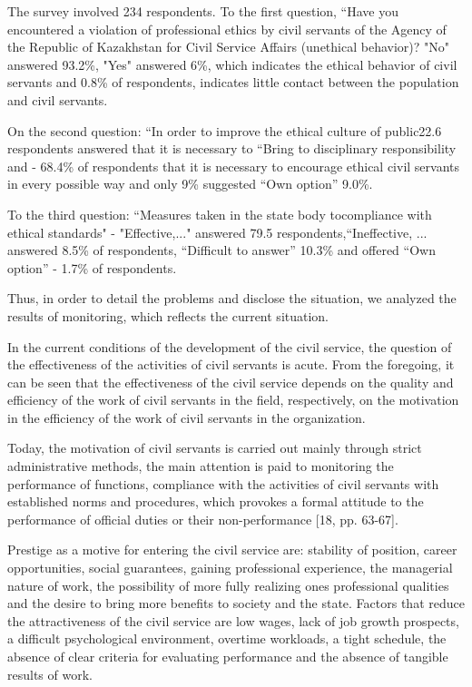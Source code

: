 \begin{multicols}{2}
The survey involved 234 respondents. To the first question, ``Have you
encountered a violation of professional ethics by civil servants of the
Agency of the Republic of Kazakhstan for Civil Service Affairs
(unethical behavior)? "No" answered 93.2\%, "Yes" answered 6\%, which
indicates the ethical behavior of civil servants and 0.8\% of
respondents, indicates little contact between the population and civil
servants.

On the second question: ``In order to improve the ethical culture of
public22.6 respondents answered that it is necessary to ``Bring to
disciplinary responsibility and - 68.4\% of respondents that it is
necessary to encourage ethical civil servants in every possible way and
only 9\% suggested ``Own option'' 9.0\%.

To the third question: ``Measures taken in the state body tocompliance
with ethical standards" - "Effective,..." answered 79.5
respondents,``Ineffective, ... answered 8.5\% of respondents,
``Difficult to answer'' 10.3\% and offered ``Own option'' - 1.7\% of
respondents.

Thus, in order to detail the problems and disclose the situation, we
analyzed the results of monitoring, which reflects the current
situation.

In the current conditions of the development of the civil service, the
question of the effectiveness of the activities of civil servants is
acute. From the foregoing, it can be seen that the effectiveness of the
civil service depends on the quality and efficiency of the work of civil
servants in the field, respectively, on the motivation in the efficiency
of the work of civil servants in the organization.

Today, the motivation of civil servants is carried out mainly through
strict administrative methods, the main attention is paid to monitoring
the performance of functions, compliance with the activities of civil
servants with established norms and procedures, which provokes a formal
attitude to the performance of official duties or their non-performance
{[}18, pp. 63-67{]}.

Prestige as a motive for entering the civil service are: stability of
position, career opportunities, social guarantees, gaining professional
experience, the managerial nature of work, the possibility of more fully
realizing one\textquotesingle s professional qualities and the desire to
bring more benefits to society and the state. Factors that reduce the
attractiveness of the civil service are low wages, lack of job growth
prospects, a difficult psychological environment, overtime workloads, a
tight schedule, the absence of clear criteria for evaluating performance
and the absence of tangible results of work.


\end{multicols}

